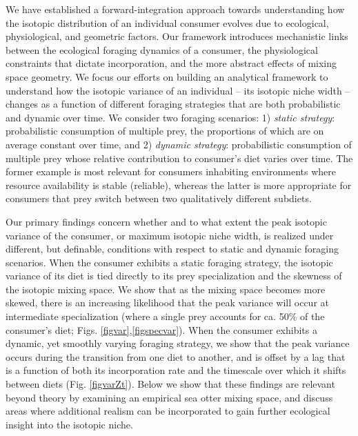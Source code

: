 \documentclass{frontiersSCNS}
\begin{document}
We have established a forward-integration approach towards understanding how the isotopic distribution of an individual consumer evolves due to ecological, physiological, and geometric factors.
Our framework introduces mechanistic links between the ecological foraging dynamics of a consumer, the physiological constraints that dictate incorporation, and the more abstract effects of mixing space geometry.
We focus our efforts on building an analytical framework to understand how the isotopic variance of an individual -- its isotopic niche width -- changes as a function of different foraging strategies that are both probabilistic and dynamic over time.
We consider two foraging scenarios:
1) {\it static strategy}: probabilistic consumption of multiple prey, the proportions of which are on average constant over time, and
2) {\it dynamic strategy}: probabilistic consumption of multiple prey whose relative contribution to consumer's diet varies over time.
The former example is most relevant for consumers inhabiting environments where resource availability is stable (reliable), whereas the latter is more appropriate for consumers that prey switch between two qualitatively different subdiets.

Our primary findings concern whether and to what extent the peak isotopic variance of the consumer, or maximum isotopic niche width, is realized under different, but definable, conditions with respect to static and dynamic foraging scenarios.
When the consumer exhibits a static foraging strategy, the isotopic variance of its diet is tied directly to its prey specialization and the skewness of the isotopic mixing space.
We show that as the mixing space becomes more skewed, there is an increasing likelihood that the peak variance will occur at intermediate specialization (where a single prey accounts for ca. 50\% of the consumer's diet; Figs. \ref{figvar},\ref{figspecvar}).
When the consumer exhibits a dynamic, yet smoothly varying foraging strategy, we show that the peak variance occurs during the transition from one diet to another, and is offset by a lag that is a function of both its incorporation rate and the timescale over which it shifts between diets (Fig. \ref{figvarZt}).
Below we show that these findings are relevant beyond theory by examining an empirical sea otter mixing space, and discuss areas where additional realism can be incorporated to gain further ecological insight into the isotopic niche.
\end{document}
